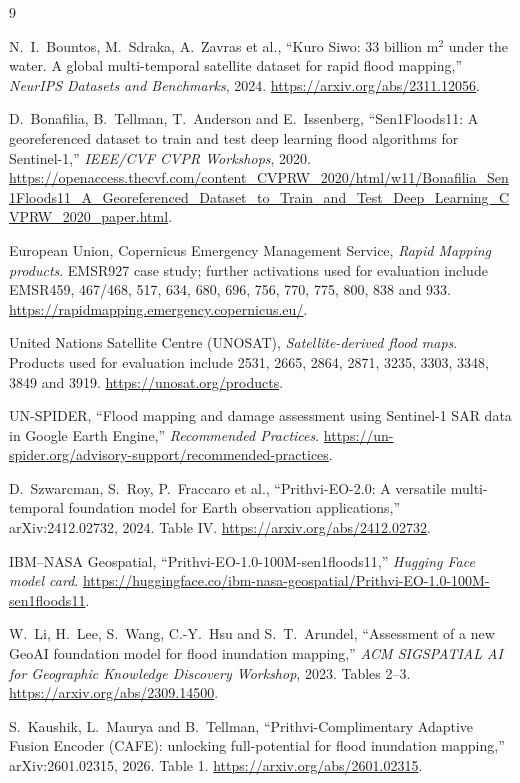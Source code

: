 \documentclass[10pt,twocolumn,letterpaper]{article}
\begin{document}
\begin{thebibliography}{9}
\footnotesize
\raggedright
{}
N.~I.~Bountos, M.~Sdraka, A.~Zavras et al., ``Kuro Siwo: 33 billion $\mathrm{m}^2$ under the water.
A global multi-temporal satellite dataset for rapid flood mapping,'' \textit{NeurIPS Datasets and
Benchmarks}, 2024. \url{https://arxiv.org/abs/2311.12056}.

D.~Bonafilia, B.~Tellman, T.~Anderson and E.~Issenberg, ``Sen1Floods11: A georeferenced dataset to
train and test deep learning flood algorithms for Sentinel-1,'' \textit{IEEE/CVF CVPR Workshops},
2020.
\url{https://openaccess.thecvf.com/content_CVPRW_2020/html/w11/Bonafilia_Sen1Floods11_A_Georeferenced_Dataset_to_Train_and_Test_Deep_Learning_CVPRW_2020_paper.html}.

European Union, Copernicus Emergency Management Service, \textit{Rapid Mapping products}. EMSR927
case study; further activations used for evaluation include EMSR459, 467/468, 517, 634, 680, 696,
756, 770, 775, 800, 838 and 933. \url{https://rapidmapping.emergency.copernicus.eu/}.

United Nations Satellite Centre (UNOSAT), \textit{Satellite-derived flood maps}. Products used for
evaluation include 2531, 2665, 2864, 2871, 3235, 3303, 3348, 3849 and 3919.
\url{https://unosat.org/products}.

UN-SPIDER, ``Flood mapping and damage assessment using Sentinel-1 SAR data in Google Earth Engine,''
\textit{Recommended Practices}. \url{https://un-spider.org/advisory-support/recommended-practices}.

D.~Szwarcman, S.~Roy, P.~Fraccaro et al., ``Prithvi-EO-2.0: A versatile multi-temporal foundation
model for Earth observation applications,'' arXiv:2412.02732, 2024. Table IV.
\url{https://arxiv.org/abs/2412.02732}.

IBM--NASA Geospatial, ``Prithvi-EO-1.0-100M-sen1floods11,'' \textit{Hugging Face model card}.
\url{https://huggingface.co/ibm-nasa-geospatial/Prithvi-EO-1.0-100M-sen1floods11}.

W.~Li, H.~Lee, S.~Wang, C.-Y.~Hsu and S.~T.~Arundel, ``Assessment of a new GeoAI foundation model
for flood inundation mapping,'' \textit{ACM SIGSPATIAL AI for Geographic Knowledge Discovery
Workshop}, 2023. Tables 2--3. \url{https://arxiv.org/abs/2309.14500}.

S.~Kaushik, L.~Maurya and B.~Tellman, ``Prithvi-Complimentary Adaptive Fusion Encoder (CAFE):
unlocking full-potential for flood inundation mapping,'' arXiv:2601.02315, 2026. Table 1.
\url{https://arxiv.org/abs/2601.02315}.
\end{thebibliography}
\end{document}
